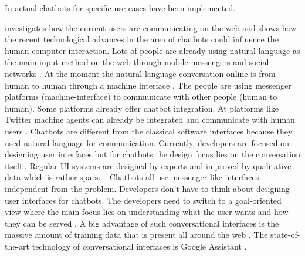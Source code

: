 In \citet{dutta2017developing, pharmacybot} actual chatbots for specific use cases have been implemented.



\citet{folstad2017chatbots} investigates how the current users are communicating on the web and shows how 
the recent technological advances in the area of chatbots could influence the human-computer interaction.
Lots of people are already using natural language as the main input method on the web through mobile messengers 
and social networks \cite{folstad2017chatbots}. 
At the moment the natural language conversation online is from human to human through a machine interface \cite{folstad2017chatbots}.
The people are using messenger platforms (machine-interface) to communicate with other people (human to human).
Some platforms already offer chatbot integration. 
At platforms like Twitter machine agents can already be integrated and communicate with human users \cite{folstad2017chatbots}. 
Chatbots are different from the classical software interfaces because they used natural language 
for communication.
Currently, developers are focused on designing user interfaces but for chatbots the design focus 
lies on the conversation itself \cite{folstad2017chatbots}. 
Regular UI systems are designed by experts and improved by qualitative data which is rather sparse \cite{folstad2017chatbots}.
Chatbots all use messenger like interfaces independent from the problem.
Developers don't have to think about designing user interfaces for chatbots.
The developers need to switch to a goal-oriented view where the main focus 
lies on understanding what the user wants and how they can be served \cite{folstad2017chatbots}.
A big advantage of such conversational interfaces is the massive amount of training data that is present all around the web \cite{folstad2017chatbots}. 
The state-of-the-art technology of conversational interfaces is Google Assistant \cite{folstad2017chatbots}.

